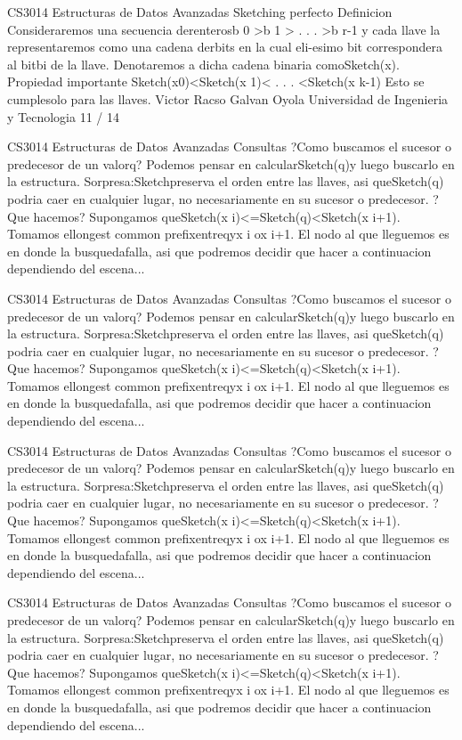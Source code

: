 \begin{description}[leftmargin=!,labelwidth=4.2em,style=nextline]
\item[Pag. 40] CS3014 Estructuras de Datos Avanzadas Sketching perfecto Definicion Consideraremos una secuencia derenterosb 0 >b 1 > . . . >b r-1 y cada llave la representaremos como una cadena derbits en la cual eli-esimo bit correspondera al bitbi de la llave. Denotaremos a dicha cadena binaria comoSketch(x). Propiedad importante Sketch(x0)<Sketch(x 1)< . . . <Sketch(x k-1) Esto se cumplesolo para las llaves. Victor Racso Galvan Oyola Universidad de Ingenieria y Tecnologia 11 / 14
\item[Pag. 41] CS3014 Estructuras de Datos Avanzadas Consultas ?Como buscamos el sucesor o predecesor de un valorq? Podemos pensar en calcularSketch(q)y luego buscarlo en la estructura. Sorpresa:Sketchpreserva el orden entre las llaves, asi queSketch(q) podria caer en cualquier lugar, no necesariamente en su sucesor o predecesor. ?Que hacemos? Supongamos queSketch(x i)<=Sketch(q)<Sketch(x i+1). Tomamos ellongest common prefixentreqyx i ox i+1. El nodo al que lleguemos es en donde la busquedafalla, asi que podremos decidir que hacer a continuacion dependiendo del escena...
\item[Pag. 42] CS3014 Estructuras de Datos Avanzadas Consultas ?Como buscamos el sucesor o predecesor de un valorq? Podemos pensar en calcularSketch(q)y luego buscarlo en la estructura. Sorpresa:Sketchpreserva el orden entre las llaves, asi queSketch(q) podria caer en cualquier lugar, no necesariamente en su sucesor o predecesor. ?Que hacemos? Supongamos queSketch(x i)<=Sketch(q)<Sketch(x i+1). Tomamos ellongest common prefixentreqyx i ox i+1. El nodo al que lleguemos es en donde la busquedafalla, asi que podremos decidir que hacer a continuacion dependiendo del escena...
\item[Pag. 43] CS3014 Estructuras de Datos Avanzadas Consultas ?Como buscamos el sucesor o predecesor de un valorq? Podemos pensar en calcularSketch(q)y luego buscarlo en la estructura. Sorpresa:Sketchpreserva el orden entre las llaves, asi queSketch(q) podria caer en cualquier lugar, no necesariamente en su sucesor o predecesor. ?Que hacemos? Supongamos queSketch(x i)<=Sketch(q)<Sketch(x i+1). Tomamos ellongest common prefixentreqyx i ox i+1. El nodo al que lleguemos es en donde la busquedafalla, asi que podremos decidir que hacer a continuacion dependiendo del escena...
\item[Pag. 44] CS3014 Estructuras de Datos Avanzadas Consultas ?Como buscamos el sucesor o predecesor de un valorq? Podemos pensar en calcularSketch(q)y luego buscarlo en la estructura. Sorpresa:Sketchpreserva el orden entre las llaves, asi queSketch(q) podria caer en cualquier lugar, no necesariamente en su sucesor o predecesor. ?Que hacemos? Supongamos queSketch(x i)<=Sketch(q)<Sketch(x i+1). Tomamos ellongest common prefixentreqyx i ox i+1. El nodo al que lleguemos es en donde la busquedafalla, asi que podremos decidir que hacer a continuacion dependiendo del escena...

\end{description}
